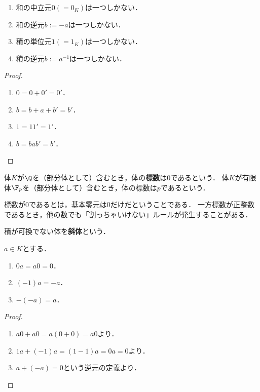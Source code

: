 \documentclass[uplatex, dvipdfmx]{jsreport}
\begin{document}
\begin{lemma}\mbox{}
    \begin{enumerate}
        \item 和の中立元$0(=0_K)$は一つしかない．
        \item 和の逆元$b:=-a$は一つしかない．
        \item 積の単位元$1(=1_K)$は一つしかない．
        \item 積の逆元$b:=a^{-1}$は一つしかない．
    \end{enumerate}
\end{lemma}
\begin{proof}
    \begin{enumerate}
        \item $0=0+0'=0'$．
        \item $b=b+a+b'=b'$．
        \item $1=11'=1'$．
        \item $b=bab'=b'$．
    \end{enumerate}
\end{proof}

\begin{definition}[characteristic]
    体$K$が$\Q$を（部分体として）含むとき，体の\textbf{標数}は$0$であるという．
    体$K$が有限体$\F_p$を（部分体として）含むとき，体の標数は$p$であるという．
\end{definition}
\begin{remark}
    標数が$0$であるとは，基本零元は$0$だけだということである．
    一方標数が正整数であるとき，他の数でも「割っちゃいけない」ルールが発生することがある．
\end{remark}

\begin{definition}
    積が可換でない体を\textbf{斜体}という．
\end{definition}

\begin{proposition}
    $a\in K$とする．
    \begin{enumerate}
        \item $0a=a0=0$．
        \item $(-1)a=-a$．
        \item $-(-a)=a$．
    \end{enumerate}
\end{proposition}
\begin{proof}
    \begin{enumerate}
        \item $a0+a0=a(0+0)=a0$より．
        \item $1a+(-1)a=(1-1)a=0a=0$より．
        \item $a+(-a)=0$という逆元の定義より．
    \end{enumerate}
\end{proof}
\end{document}
